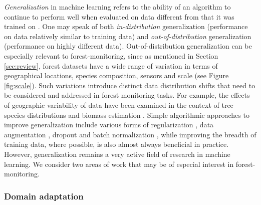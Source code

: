 \documentclass{CUP-JNL-DTM}%
\theoremstyle{definition}
\numberwithin{equation}{section}
\begin{document}
\emph{Generalization} in machine learning refers to the ability of an algorithm to continue to perform well when evaluated on data different from that it was trained on \cite{zhang_understanding_2017}. One may speak of both \emph{in-distribution} generalization (performance on data relatively similar to training data) and \emph{out-of-distribution} generalization (performance on highly different data). Out-of-distribution generalization can be especially relevant to forest-monitoring, since as mentioned in Section \ref{sec:review}, forest datasets have a wide range of variation in terms of geographical locations, species composition, sensors and scale (see Figure \ref{fig:scale}). Such variations introduce distinct data distribution shifts that need to be considered and addressed in forest monitoring tasks. For example, the effects of geographic variability of data have been examined in the context of tree species distributions \cite{f_dormann_methods_2007} and biomass estimation \citep{ploton2020spatial}. Simple algorithmic approaches to improve generalization include various forms of regularization \cite{zou_regularization_2005}, data augmentation \cite{shorten_survey_2019}, dropout \cite{srivastava_dropout_2014} and batch normalization \cite{ioffe_batch_2015}, while improving the breadth of training data, where possible, is also almost always beneficial in practice. However, generalization remains a very active field of research in machine learning. We consider two areas of work that may be of especial interest in forest-monitoring.
%

\subsubsection{Domain adaptation}
\label{sec:ml_domain}
\end{document}
